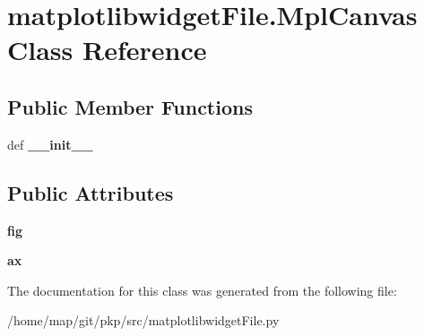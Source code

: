 \hypertarget{classmatplotlibwidgetFile_1_1MplCanvas}{\section{matplotlibwidget\-File.\-Mpl\-Canvas \-Class \-Reference}
\label{classmatplotlibwidgetFile_1_1MplCanvas}
}
\subsection*{\-Public \-Member \-Functions}
\begin{DoxyCompactItemize}
\item 
\hypertarget{classmatplotlibwidgetFile_1_1MplCanvas_a6eb3342e3b3e6a6d49385be5456f6ad9}{def {\bfseries \-\_\-\-\_\-init\-\_\-\-\_\-}}\label{classmatplotlibwidgetFile_1_1MplCanvas_a6eb3342e3b3e6a6d49385be5456f6ad9}

\end{DoxyCompactItemize}
\subsection*{\-Public \-Attributes}
\begin{DoxyCompactItemize}
\item 
\hypertarget{classmatplotlibwidgetFile_1_1MplCanvas_ac2706b697b985cc1b16feaa545b1c4f9}{{\bfseries fig}}\label{classmatplotlibwidgetFile_1_1MplCanvas_ac2706b697b985cc1b16feaa545b1c4f9}

\item 
\hypertarget{classmatplotlibwidgetFile_1_1MplCanvas_aff43023ca9dd98716cee5616643e8d55}{{\bfseries ax}}\label{classmatplotlibwidgetFile_1_1MplCanvas_aff43023ca9dd98716cee5616643e8d55}

\end{DoxyCompactItemize}


\-The documentation for this class was generated from the following file\-:\begin{DoxyCompactItemize}
\item 
/home/map/git/pkp/src/matplotlibwidget\-File.\-py\end{DoxyCompactItemize}
